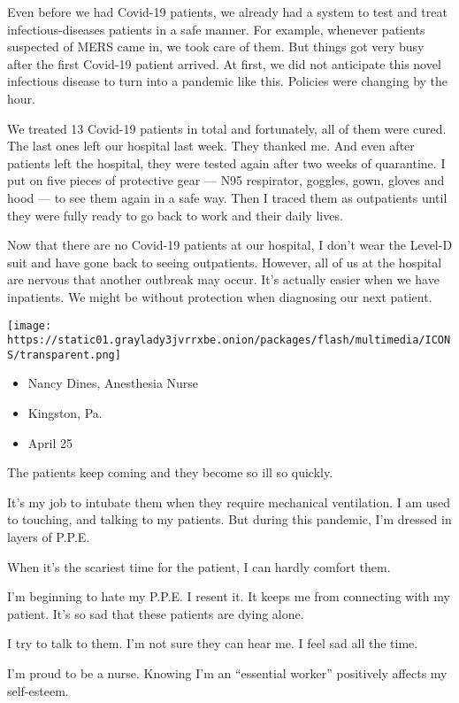 Even before we had Covid-19 patients, we already had a system to test
and treat infectious-diseases patients in a safe manner. For example,
whenever patients suspected of MERS came in, we took care of them. But
things got very busy after the first Covid-19 patient arrived. At first,
we did not anticipate this novel infectious disease to turn into a
pandemic like this. Policies were changing by the hour.

We treated 13 Covid-19 patients in total and fortunately, all of them
were cured. The last ones left our hospital last week. They thanked me.
And even after patients left the hospital, they were tested again after
two weeks of quarantine. I put on five pieces of protective gear --- N95
respirator, goggles, gown, gloves and hood --- to see them again in a
safe way. Then I traced them as outpatients until they were fully ready
to go back to work and their daily lives.

Now that there are no Covid-19 patients at our hospital, I don't wear
the Level-D suit and have gone back to seeing outpatients. However, all
of us at the hospital are nervous that another outbreak may occur. It's
actually easier when we have inpatients. We might be without protection
when diagnosing our next patient.

\texttt{[image: https://static01.graylady3jvrrxbe.onion/packages/flash/multimedia/ICONS/transparent.png]}

\begin{itemize}
\tightlist
\item
  Nancy Dines, Anesthesia Nurse
\item
  Kingston, Pa.
\item
  April 25
\end{itemize}

The patients keep coming and they become so ill so quickly.

It's my job to intubate them when they require mechanical ventilation. I
am used to touching, and talking to my patients. But during this
pandemic, I'm dressed in layers of P.P.E.

When it's the scariest time for the patient, I can hardly comfort them.

I'm beginning to hate my P.P.E. I resent it. It keeps me from connecting
with my patient. It's so sad that these patients are dying alone.

I try to talk to them. I'm not sure they can hear me. I feel sad all the
time.

I'm proud to be a nurse. Knowing I'm an ``essential worker'' positively
affects my self-esteem.


